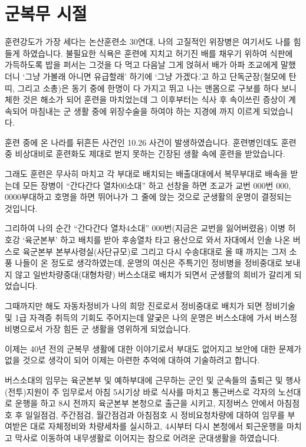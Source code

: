 \documentclass[chapter,book,openany,twoside]{oblivoir}
\begin{document}
\chapter{군복무 시절}

훈련강도가 가장 세다는 논산훈련소 30연대, 나의 고질적인 위장병은 여기서도 나를 힘들게 하였습니다. 불필요한 식욕은 훈련에 지치고 허기진 배를 채우기 위하여 식판에 가득하도록 밥을 퍼서는 그것을 다 먹고 다음날 그게 얹혀서 배가 아파 조교에게 말했더니 `그냥 가볼래 아니면 유급할래' 하기에 `그냥 가겠다.'고 하고 단독군장(철모에 탄띠, 그리고 소총)은 동기 중에 한명이 다 가지고 뛰고 나는 맨몸으로 구보를 하다 보니 체한 것은 해소가 되어 훈련을 마치었는데 그 이후부터는 식사 후 속이쓰린 증상이 계속되어 마침내는 군 생활 중에 위장수술을 하여야 하는 지경에 까지 이르게 되었습니다.

훈련 중에 온 나라를 뒤흔든 사건인 10.26 사건이 발생하였습니다. 훈련병인데도 훈련 중 비상대비로 훈련화도 제대로 벋지 못하는 긴장된 생활 속에 훈련을 받았습니다.

그래도 훈련은 무사히 마치고 각 부대로 배치되는 배출대대에서 복무부대로 배속을 받는데 모든 장병이 ``간다간다 열차00소대'' 하고 선창을 하면 조교가 교번 000번 000, 0000부대하고 호명을 하면 뛰어나가 그 줄에 앉는 것으로 군생활의 운명이 결정되는 것입니다.

그리하여 나의 순간 ``간다간다 열차4소대'' 000번(지금은 교번을 잃어버렸음) 이병 허호강 `육군본부' 하고 배치를 받아 후송열차 타고 용산으로 와서 자대에서 인솔 나온 버스로 육군본부 본부사령실(사단규모)로 그리고 다시 수송대대로 올 때 까지는 그저 소풍 나들이 온 정도로 생각하였는데, 운명의 여신은 주특기인 정비병을 정비중대로 보내지 않고 일반차량중대(대형차량) 버스소대로 배치가 되면서 군생활의 희비가 갈리게 되었습니다.

그때까지만 해도 자동차정비가 나의 희망 진로로서 정비중대로 배치가 되면 정비기술 및 1급 자격증 취득의 기회도 주어지는데 얄궂은 나의 운명은 버스소대에 가서 버스정비병으로서 가장 힘든 군 생활을 영위하게 되었습니다.

이제는 40년 전의 군복무 생활에 대한 이야기로서 부대도 없어지고 보안에 대한 문제가 없을 것으로 생각이 되어 이제는 아련한 추억에 대하여 기술하려고 합니다.

버스소대의 임무는 육군본부 및 예하부대에 근무하는 군인 및 군속들의 출퇴근 및 행사(전투)지원이 주 임무로서 아침 5시기상 바로 식사를 마치고 통근버스로 각자의 노선대로 운행을 하고 8시 전까지 육군본부 본청으로 출근을 시키고, 지정버스 안에서 아침점호 후 일일점검, 주간점검, 월간점검과 아침점호 시 정비요청차량에 대하여 임무를 부여받은 대로 자체정비와 차량세차를 실시하고, 4시부터 다시 본청에서 퇴근운행을 마치고 막사로 이동하여 내무생활로 이어지는 참으로 어려운 군대생활을 하였습니다.
\end{document}
